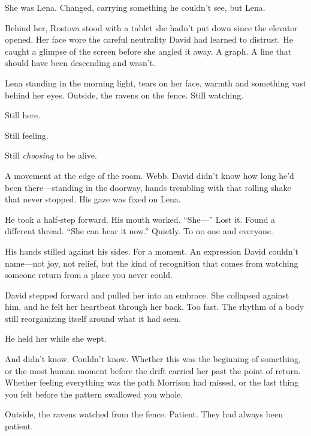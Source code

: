 She was Lena. Changed, carrying something he couldn't see, but Lena.

Behind her, Rostova stood with a tablet she hadn't put down since the elevator opened. Her face wore the careful neutrality David had learned to distrust. He caught a glimpse of the screen before she angled it away. A graph. A line that should have been descending and wasn't.

Lena standing in the morning light, tears on her face, warmth and something vast behind her eyes. Outside, the ravens on the fence. Still watching.

Still here.

Still feeling.

Still \textit{choosing} to be alive.

A movement at the edge of the room. Webb. David didn't know how long he'd been there—standing in the doorway, hands trembling with that rolling shake that never stopped. His gaze was fixed on Lena.

He took a half-step forward. His mouth worked. ``She—'' Lost it. Found a different thread. ``She can hear it now.'' Quietly. To no one and everyone.

His hands stilled against his sides. For a moment. An expression David couldn't name—not joy, not relief, but the kind of recognition that comes from watching someone return from a place you never could.

David stepped forward and pulled her into an embrace. She collapsed against him, and he felt her heartbeat through her back. Too fast. The rhythm of a body still reorganizing itself around what it had seen.

He held her while she wept.

And didn't know. Couldn't know. Whether this was the beginning of something, or the most human moment before the drift carried her past the point of return. Whether feeling everything was the path Morrison had missed, or the last thing you felt before the pattern swallowed you whole.

Outside, the ravens watched from the fence. Patient. They had always been patient.
